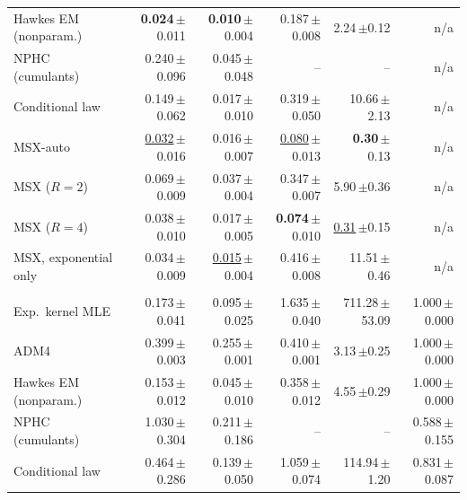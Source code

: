 \begin{tabular}{lrrrrr}
\quad Hawkes EM (nonparam.) & \textbf{0.024}{\scriptsize\,$\pm$0.011} & \textbf{0.010}{\scriptsize\,$\pm$0.004} & 0.187{\scriptsize\,$\pm$0.008} & 2.24{\scriptsize\,$\pm$0.12} & n/a \\
\quad NPHC (cumulants) & 0.240{\scriptsize\,$\pm$0.096} & 0.045{\scriptsize\,$\pm$0.048} & -- & -- & n/a \\
\quad Conditional law & 0.149{\scriptsize\,$\pm$0.062} & 0.017{\scriptsize\,$\pm$0.010} & 0.319{\scriptsize\,$\pm$0.050} & 10.66{\scriptsize\,$\pm$2.13} & n/a \\
\rowcolor{oursbg} \quad MSX-auto & \underline{0.032}{\scriptsize\,$\pm$0.016} & 0.016{\scriptsize\,$\pm$0.007} & \underline{0.080}{\scriptsize\,$\pm$0.013} & \textbf{0.30}{\scriptsize\,$\pm$0.13} & n/a \\
\rowcolor{oursbg} \quad MSX ($R=2$) & 0.069{\scriptsize\,$\pm$0.009} & 0.037{\scriptsize\,$\pm$0.004} & 0.347{\scriptsize\,$\pm$0.007} & 5.90{\scriptsize\,$\pm$0.36} & n/a \\
\rowcolor{oursbg} \quad MSX ($R=4$) & 0.038{\scriptsize\,$\pm$0.010} & 0.017{\scriptsize\,$\pm$0.005} & \textbf{0.074}{\scriptsize\,$\pm$0.010} & \underline{0.31}{\scriptsize\,$\pm$0.15} & n/a \\
\rowcolor{oursbg} \quad MSX, exponential only & 0.034{\scriptsize\,$\pm$0.009} & \underline{0.015}{\scriptsize\,$\pm$0.004} & 0.416{\scriptsize\,$\pm$0.008} & 11.51{\scriptsize\,$\pm$0.46} & n/a \\
\addlinespace[3pt]\multicolumn{6}{l}{\textit{S4: multiscale network}} \\[1pt]
\quad Exp.\ kernel MLE & 0.173{\scriptsize\,$\pm$0.041} & 0.095{\scriptsize\,$\pm$0.025} & 1.635{\scriptsize\,$\pm$0.040} & 711.28{\scriptsize\,$\pm$53.09} & 1.000{\scriptsize\,$\pm$0.000} \\
\quad ADM4 & 0.399{\scriptsize\,$\pm$0.003} & 0.255{\scriptsize\,$\pm$0.001} & 0.410{\scriptsize\,$\pm$0.001} & 3.13{\scriptsize\,$\pm$0.25} & 1.000{\scriptsize\,$\pm$0.000} \\
\quad Hawkes EM (nonparam.) & 0.153{\scriptsize\,$\pm$0.012} & 0.045{\scriptsize\,$\pm$0.010} & 0.358{\scriptsize\,$\pm$0.012} & 4.55{\scriptsize\,$\pm$0.29} & 1.000{\scriptsize\,$\pm$0.000} \\
\quad NPHC (cumulants) & 1.030{\scriptsize\,$\pm$0.304} & 0.211{\scriptsize\,$\pm$0.186} & -- & -- & 0.588{\scriptsize\,$\pm$0.155} \\
\quad Conditional law & 0.464{\scriptsize\,$\pm$0.286} & 0.139{\scriptsize\,$\pm$0.050} & 1.059{\scriptsize\,$\pm$0.074} & 114.94{\scriptsize\,$\pm$1.20} & 0.831{\scriptsize\,$\pm$0.087} \\

\end{tabular}
